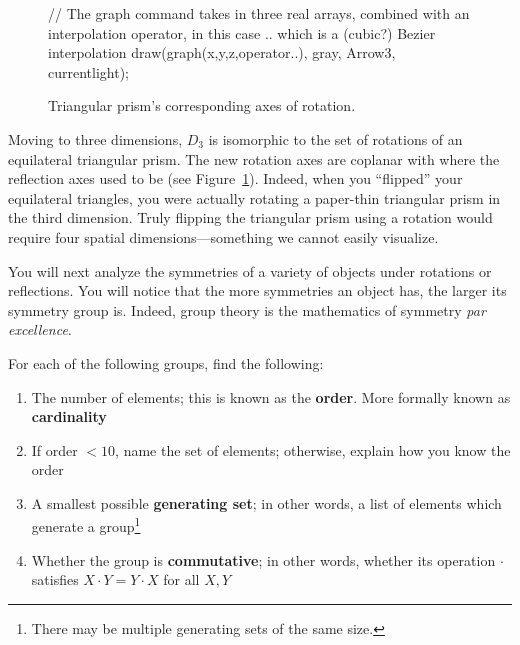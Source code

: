 \documentclass[../textbook.tex]{subfiles}
\begin{document}
\begin{figure}[h]
\begin{center}
\begin{minipage}[b]{\textwidth}
\begin{asy}[width=0.5\textwidth]
				// The graph command takes in three real arrays, combined with an interpolation operator, in this case .. which is a (cubic?) Bezier interpolation
				draw(graph(x,y,z,operator..), gray, Arrow3, currentlight);
			\end{asy}
		\end{minipage}
	\end{center}
	\vspace*{-2\baselineskip}
	\begin{center}
		\begin{minipage}[t]{\textwidth}
			\caption{Triangular prism's corresponding axes of rotation.}
			\label{fig:tri_prism_rot}
		\end{minipage}
	\end{center}
	\vspace*{-2\baselineskip}
\end{figure}

\noindent Moving to three dimensions, $D_3$ is isomorphic to the set of rotations of an equilateral triangular prism. The new rotation axes are coplanar with where the reflection axes used to be (see Figure~\ref{fig:tri_prism_rot}). Indeed, when you ``flipped'' your equilateral triangles, you were actually rotating a paper-thin triangular prism in the third dimension. Truly flipping the triangular prism using a rotation would require four spatial dimensions---something we cannot easily visualize.

You will next analyze the symmetries of a variety of objects under rotations or reflections. You will notice that the more symmetries an object has, the larger its symmetry group is. Indeed, group theory is the mathematics of symmetry \textit{par excellence}.

For each of the following groups, find the following:

\begin{enumerate}[label=(\alph*)]
\item The number of elements; this is known as the \textbf{order}. More formally known as \textbf{cardinality}
\item If order $< 10$, name the set of elements; otherwise, explain how you know the order
\item A smallest possible \textbf{generating set}; in other words, a list of elements which generate a group\footnote{There may be multiple generating sets of the same size.}
\item Whether the group is \textbf{commutative}; in other words, whether its operation $\cdot$ satisfies $X\cdot Y=Y\cdot X$ for all $X,Y$ %
\end{enumerate}
\end{document}
